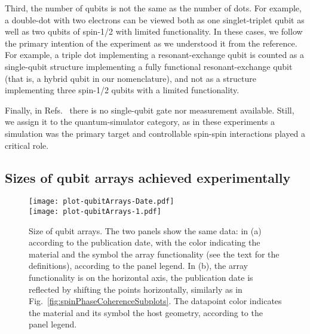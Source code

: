 \documentclass[aps, prx, showpacs, twocolumn, superscriptaddress, notitlepage, longbibliography, floatfix, nofootinbib]{revtex4-2}
\begin{document}
Third, the number of qubits is not the same as the number of dots. For example, a double-dot with two electrons can be viewed both as one singlet-triplet qubit as well as two qubits of spin-1/2 with limited functionality. In these cases, we follow the primary intention of the experiment as we understood it from the reference. For example, a triple dot implementing a resonant-exchange qubit is counted as a single-qubit structure implementing a fully functional resonant-exchange qubit (that is, a hybrid qubit in our nomenclature), and not as a structure implementing three spin-1/2 qubits with a limited functionality.

Finally, in Refs.~\cite{van_diepen_quantum_2021,dehollain_nagaoka_2020} there is no single-qubit gate nor measurement available. Still, we assign it to the quantum-simulator category, as in these experiments a simulation was the primary target and controllable spin-spin interactions played a critical role.

\subsection{Sizes of qubit arrays achieved experimentally}


\begin{figure}[t!]
  \texttt{[image: plot-qubitArrays-Date.pdf]}\\ 
    \texttt{[image: plot-qubitArrays-1.pdf]}
  \caption{
  \label{fig:arraySize}
  Size of qubit arrays. The two panels show the same data: in (a) according to the publication date, with the color indicating the material and the symbol the array functionality (see the text for the definitions), according to the panel legend. In (b), the array functionality is on the horizontal axis, the publication date is reflected by shifting the points horizontally, similarly as in Fig.~\ref{fig:spinPhaseCoherenceSubplots}. The datapoint color indicates the material and its symbol the host geometry, according to the panel legend.
  }
\end{figure}
\end{document}
